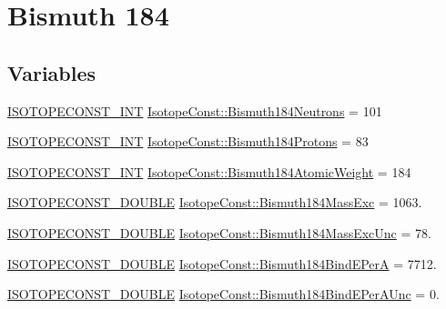 \hypertarget{group___isotope_const-_bismuth-_bi184}{}\section{Bismuth 184}
\label{group___isotope_const-_bismuth-_bi184}
\subsection*{Variables}
\begin{DoxyCompactItemize}
\item 
\mbox{\hyperlink{group___isotope_const-_macros_ga5f18360b3e99483a35c32d789e62621c}{I\+S\+O\+T\+O\+P\+E\+C\+O\+N\+S\+T\+\_\+\+I\+NT}} \mbox{\hyperlink{group___isotope_const-_bismuth-_bi184_ga7fe8ff4a3721976642c9eb7c8bb52cc6}{Isotope\+Const\+::\+Bismuth184\+Neutrons}} = 101
\item 
\mbox{\hyperlink{group___isotope_const-_macros_ga5f18360b3e99483a35c32d789e62621c}{I\+S\+O\+T\+O\+P\+E\+C\+O\+N\+S\+T\+\_\+\+I\+NT}} \mbox{\hyperlink{group___isotope_const-_bismuth-_bi184_gaf3a7101513fddc6d2269e96e0a0039ed}{Isotope\+Const\+::\+Bismuth184\+Protons}} = 83
\item 
\mbox{\hyperlink{group___isotope_const-_macros_ga5f18360b3e99483a35c32d789e62621c}{I\+S\+O\+T\+O\+P\+E\+C\+O\+N\+S\+T\+\_\+\+I\+NT}} \mbox{\hyperlink{group___isotope_const-_bismuth-_bi184_gae0976f524a59eb33facb56944e5ba512}{Isotope\+Const\+::\+Bismuth184\+Atomic\+Weight}} = 184
\item 
\mbox{\hyperlink{group___isotope_const-_macros_ga8f45a7272ce02c0b4c65c44636ed719a}{I\+S\+O\+T\+O\+P\+E\+C\+O\+N\+S\+T\+\_\+\+D\+O\+U\+B\+LE}} \mbox{\hyperlink{group___isotope_const-_bismuth-_bi184_ga88a4a80dd2c29279335c8738337097a7}{Isotope\+Const\+::\+Bismuth184\+Mass\+Exc}} = 1063.
\item 
\mbox{\hyperlink{group___isotope_const-_macros_ga8f45a7272ce02c0b4c65c44636ed719a}{I\+S\+O\+T\+O\+P\+E\+C\+O\+N\+S\+T\+\_\+\+D\+O\+U\+B\+LE}} \mbox{\hyperlink{group___isotope_const-_bismuth-_bi184_ga35ac38826373900f20e28205091886fe}{Isotope\+Const\+::\+Bismuth184\+Mass\+Exc\+Unc}} = 78.
\item 
\mbox{\hyperlink{group___isotope_const-_macros_ga8f45a7272ce02c0b4c65c44636ed719a}{I\+S\+O\+T\+O\+P\+E\+C\+O\+N\+S\+T\+\_\+\+D\+O\+U\+B\+LE}} \mbox{\hyperlink{group___isotope_const-_bismuth-_bi184_ga8c356a8ee5f8ec16923a91de44a782a7}{Isotope\+Const\+::\+Bismuth184\+Bind\+E\+PerA}} = 7712.
\item 
\mbox{\hyperlink{group___isotope_const-_macros_ga8f45a7272ce02c0b4c65c44636ed719a}{I\+S\+O\+T\+O\+P\+E\+C\+O\+N\+S\+T\+\_\+\+D\+O\+U\+B\+LE}} \mbox{\hyperlink{group___isotope_const-_bismuth-_bi184_gae2106fa1aefe3b82407cd373b8323533}{Isotope\+Const\+::\+Bismuth184\+Bind\+E\+Per\+A\+Unc}} = 0.

\end{DoxyCompactItemize}
